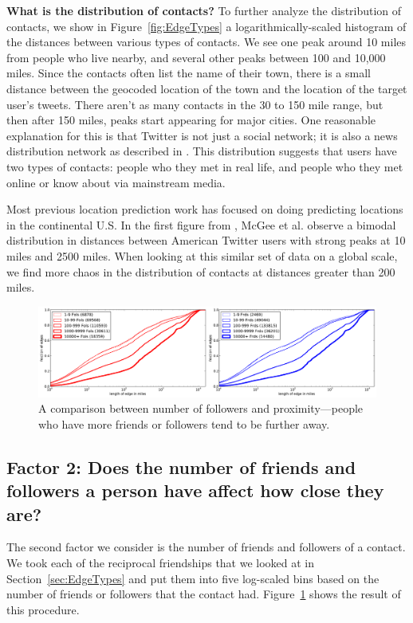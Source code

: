 \documentclass[letterpaper]{article}
\begin{document}
\noindent\textbf{What is the distribution of contacts?} To further analyze the distribution of contacts, we show in Figure~\ref{fig:EdgeTypes} a logarithmically-scaled
histogram of the distances between various types of contacts.
%
We see one peak around 10 miles from people who live nearby, and several
other peaks between 100 and 10,000 miles.
%
Since the contacts often list the name of their town, there is a small distance
between the geocoded location of the town and the location of the target
user's tweets.
%
There aren't as many contacts in the 30 to 150 mile range, but then after 150
miles, peaks start appearing for major cities.
%
One reasonable explanation for this is that Twitter is not just a social
network; it is also a news distribution network as described in
\cite{kwak2010why}.
%
This distribution suggests that users have two types of contacts: people who
they met in real life, and people who they met online or know about via
mainstream media.

Most previous location prediction work has focused on doing predicting
locations in the continental U.S.
%
In the first figure from \cite{mcgee2011geographic}, McGee et al. observe a
bimodal distribution in distances between American Twitter users with strong
peaks at 10 miles and 2500 miles.
%
When looking at this similar set of data on a global scale, we find more chaos
in the distribution of contacts at distances greater than 200 miles.

\begin{figure}[tbh]
\centering
\includegraphics[width=\linewidth]{figures/edge_counts.pdf}
\caption{
A comparison between number of followers and proximity---people who have more
friends or followers tend to be further away.
}
\label{fig:EdgeCounts}
\end{figure}

\subsection{Factor 2: Does the number of friends and followers a person have affect how
close they are?}

%
The second factor we consider is the number of friends and followers of a contact. %
%
We took each of the reciprocal friendships that we looked at in
Section~\ref{sec:EdgeTypes} and put them into five log-scaled bins based on
the number of friends or followers that the contact had.
%
Figure~\ref{fig:EdgeCounts} shows the result of this procedure.
\end{document}
